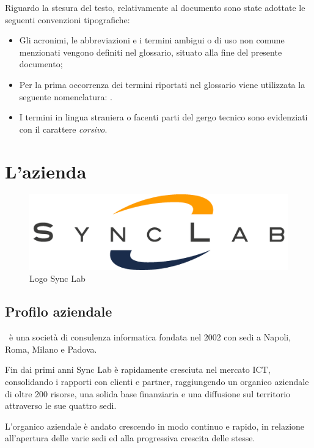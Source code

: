 Riguardo la stesura del testo, relativamente al documento sono state adottate le seguenti convenzioni tipografiche:
\begin{itemize}
	\item Gli acronimi, le abbreviazioni e i termini ambigui o di uso non comune menzionati vengono definiti nel glossario, situato alla fine del presente documento;
	\item Per la prima occorrenza dei termini riportati nel glossario viene utilizzata la seguente nomenclatura: .
	\item I termini in lingua straniera o facenti parti del gergo tecnico sono evidenziati con il carattere \emph{corsivo}.
\end{itemize}


\section{L'azienda}

\begin{figure}[H]
	\centering
	\includegraphics[width=\textwidth/2]{immagini/logo-synclab.png}
	\caption{Logo Sync Lab}
\end{figure}

\subsection{Profilo aziendale}
\myCompany\ è una società di consulenza informatica fondata nel 2002 con sedi a Napoli, Roma, Milano e Padova.

Fin dai primi anni Sync Lab è rapidamente cresciuta nel mercato ICT, consolidando i rapporti con clienti e partner, raggiungendo un organico aziendale di oltre 200 risorse,
una solida base finanziaria e una diffusione sul territorio attraverso le sue quattro sedi.

L'organico aziendale è andato crescendo in modo continuo e rapido, in relazione
all'apertura delle varie sedi ed alla progressiva crescita delle stesse.

